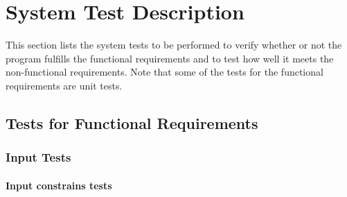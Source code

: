 \documentclass[12pt, titlepage]{article}
\begin{document}
\section{System Test Description}

This section lists the system tests to be performed to verify whether or not the
program fulfills the functional requirements and to test how well it meets the
non-functional requirements. Note that some of the tests for the functional
requirements are unit tests.

\subsection{Tests for Functional Requirements}

\subsubsection{Input Tests}

\paragraph{Input constrains tests}
\end{document}
